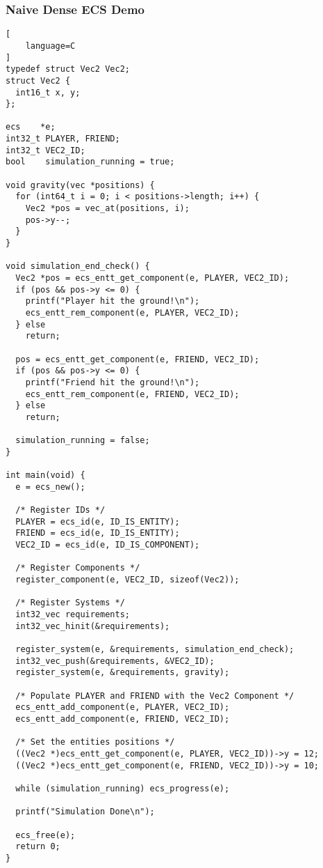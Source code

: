 \subsubsection{Naive Dense ECS Demo}
\begin{lstlisting}[
    language=C
]
typedef struct Vec2 Vec2;
struct Vec2 {
  int16_t x, y;
};

ecs    *e;
int32_t PLAYER, FRIEND;
int32_t VEC2_ID;
bool    simulation_running = true;

void gravity(vec *positions) {
  for (int64_t i = 0; i < positions->length; i++) {
    Vec2 *pos = vec_at(positions, i);
    pos->y--;
  }
}

void simulation_end_check() {
  Vec2 *pos = ecs_entt_get_component(e, PLAYER, VEC2_ID);
  if (pos && pos->y <= 0) {
    printf("Player hit the ground!\n");
    ecs_entt_rem_component(e, PLAYER, VEC2_ID);
  } else
    return;

  pos = ecs_entt_get_component(e, FRIEND, VEC2_ID);
  if (pos && pos->y <= 0) {
    printf("Friend hit the ground!\n");
    ecs_entt_rem_component(e, FRIEND, VEC2_ID);
  } else
    return;

  simulation_running = false;
}

int main(void) {
  e = ecs_new();

  /* Register IDs */
  PLAYER = ecs_id(e, ID_IS_ENTITY);
  FRIEND = ecs_id(e, ID_IS_ENTITY);
  VEC2_ID = ecs_id(e, ID_IS_COMPONENT);

  /* Register Components */
  register_component(e, VEC2_ID, sizeof(Vec2));

  /* Register Systems */
  int32_vec requirements;
  int32_vec_hinit(&requirements);

  register_system(e, &requirements, simulation_end_check);
  int32_vec_push(&requirements, &VEC2_ID);
  register_system(e, &requirements, gravity);

  /* Populate PLAYER and FRIEND with the Vec2 Component */
  ecs_entt_add_component(e, PLAYER, VEC2_ID);
  ecs_entt_add_component(e, FRIEND, VEC2_ID);

  /* Set the entities positions */
  ((Vec2 *)ecs_entt_get_component(e, PLAYER, VEC2_ID))->y = 12;
  ((Vec2 *)ecs_entt_get_component(e, FRIEND, VEC2_ID))->y = 10;

  while (simulation_running) ecs_progress(e);

  printf("Simulation Done\n");

  ecs_free(e);
  return 0;
}
\end{lstlisting}